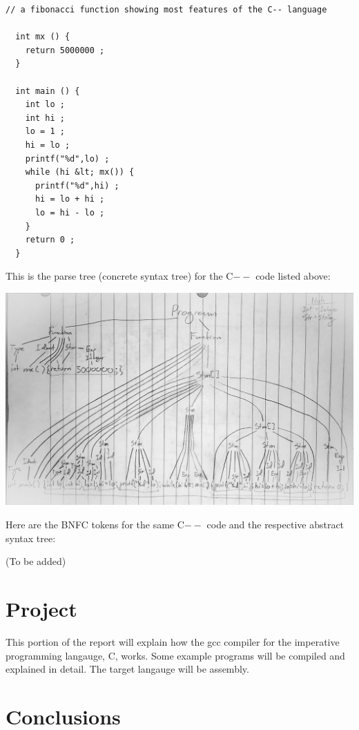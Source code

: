 \documentclass{article}
\theoremstyle{theorem}
\theoremstyle{definition}
\theoremstyle{remark}
\begin{document}
\medskip\noindent
\begin{lstlisting}[style=CStyle]
  // a fibonacci function showing most features of the C-- language

  int mx () {
    return 5000000 ;
  }

  int main () {
    int lo ; 
    int hi ;
    lo = 1 ;
    hi = lo ;
    printf("%d",lo) ;
    while (hi &lt; mx()) {
      printf("%d",hi) ;
      hi = lo + hi ;
      lo = hi - lo ;
    }
    return 0 ;
  }
\end{lstlisting}

\medskip\noindent
This is the parse tree (concrete syntax tree) for the C$--$ code listed above:

\medskip\noindent
\includegraphics[width=1\textwidth]{Images/ConcreteSyntaxTree.jpg}

\medskip\noindent
Here are the BNFC tokens for the same C$--$ code and the respective abstract syntax tree:

\medskip\noindent
(To be added)

\section{Project}
\medskip\noindent
This portion of the report will explain how the gcc compiler for  the imperative programming langauge, C, works. Some example programs will be compiled and explained in detail. The target langauge will be assembly.

\section{Conclusions}\label{conclusions}

\begin{thebibliography}{99}

\end{thebibliography}
\end{document}
